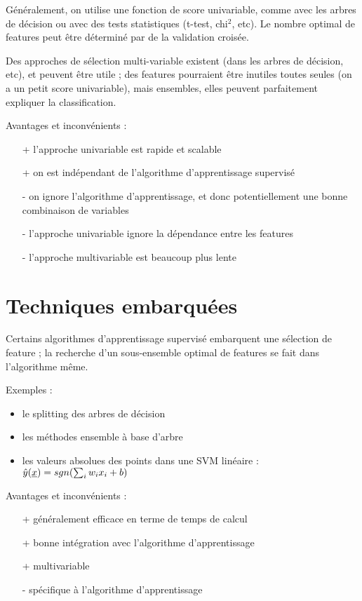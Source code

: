 	Généralement, on utilise une fonction de score univariable, comme avec les arbres de décision ou avec des tests statistiques (t-test, chi$^2$, etc). Le nombre optimal de features peut être déterminé par de la validation croisée.
	
	Des approches de sélection multi-variable existent (dans les arbres de décision, etc), et peuvent être utile ; des features pourraient être inutiles toutes seules (on a un petit score univariable), mais ensembles, elles peuvent parfaitement expliquer la classification.
	
	
	Avantages et inconvénients :
	\begin{itemize}
		\item[+] l'approche univariable est rapide et scalable
		\item[+] on est indépendant de l'algorithme d'apprentissage supervisé
		\item[-] on ignore l'algorithme d'apprentissage, et donc potentiellement une bonne combinaison de variables
		\item[-] l'approche univariable ignore la dépendance entre les features
		\item[-] l'approche multivariable est beaucoup plus lente
	\end{itemize}
	
\section{Techniques embarquées}

Certains algorithmes d'apprentissage supervisé embarquent une sélection de feature ; la recherche d'un sous-ensemble optimal de features se fait dans l'algorithme même.

Exemples :

\begin{itemize}
	\item le splitting des arbres de décision
	\item les méthodes ensemble à base d'arbre
	\item les valeurs absolues des points dans une SVM linéaire : $\hat{y}(\underline{x}) = sgn(\sum_i w_i x_i + b)$
\end{itemize}

Avantages et inconvénients :
	
\begin{itemize}
	\item[+] généralement efficace en terme de temps de calcul
	\item[+] bonne intégration avec l'algorithme d'apprentissage
	\item[+] multivariable
	\item[-] spécifique à l'algorithme d'apprentissage
\end{itemize}

